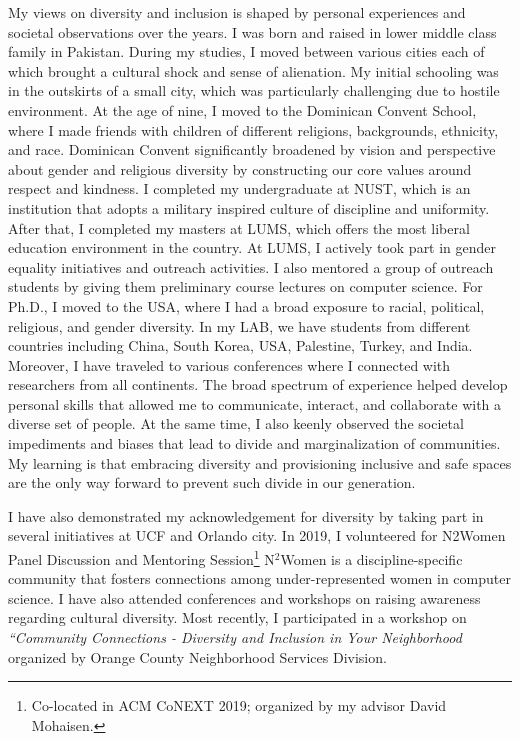 \documentclass{NSF}
\begin{document}
My views on diversity and inclusion is shaped by personal experiences and societal observations over the years. I was born and raised in lower middle class family in Pakistan. During my studies, I moved between various cities each of which brought a cultural shock and sense of alienation. My initial schooling was in the outskirts of a small city, which was particularly challenging due to hostile environment. At the age of nine, I moved to the Dominican Convent School, where I made friends with children of different religions, backgrounds, ethnicity, and race. Dominican Convent significantly broadened by vision and perspective about gender and religious diversity by constructing our core values around respect and kindness. I completed my undergraduate at NUST, which is an institution that adopts a military inspired culture of discipline and uniformity. After that, I completed my masters at LUMS, which offers the most liberal education environment in the country. At LUMS, I actively took part in gender equality initiatives and outreach activities. I also mentored a group of outreach students by giving them preliminary course lectures on computer science. For Ph.D., I moved to the USA, where I had a broad exposure to racial, political, religious, and gender diversity. In my LAB, we have students from different countries including China, South Korea, USA, Palestine, Turkey, and India. Moreover, I have traveled to various conferences where I connected with researchers from all continents. The broad spectrum of experience helped develop personal skills that allowed me to communicate, interact, and collaborate with a diverse set of people. At the same time, I also keenly observed the societal impediments and biases that lead to divide and marginalization of communities. My learning is that embracing diversity and provisioning inclusive and safe spaces are the only way forward to prevent such divide in our generation. 


I have also demonstrated my acknowledgement for diversity by taking part in several initiatives at UCF and Orlando city. In 2019, I volunteered for N2Women Panel Discussion and Mentoring Session\footnote{Co-located in ACM CoNEXT 2019; organized by my advisor David Mohaisen.} N$^{2}$Women is a discipline-specific community that fosters connections among under-represented women in computer science. I have also attended conferences and workshops on raising awareness regarding cultural diversity. Most recently, I participated in a workshop on {\em ``Community Connections - Diversity and Inclusion in Your Neighborhood} organized by Orange County Neighborhood Services Division. 
\end{document}
